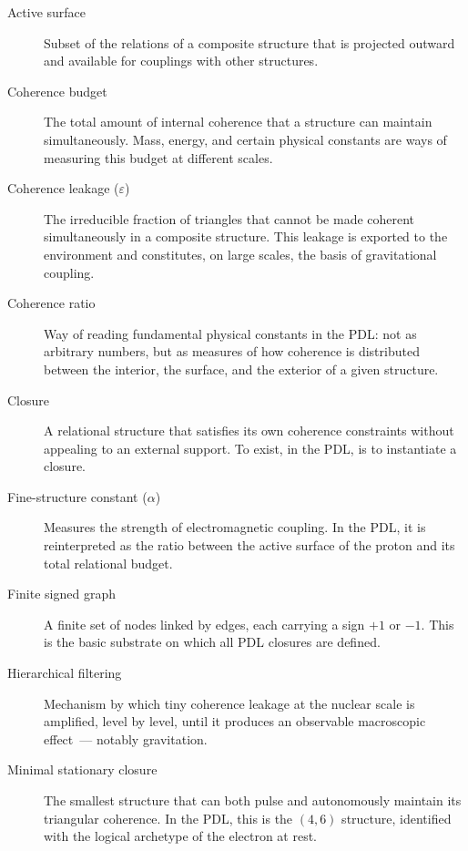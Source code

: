 \documentclass[12pt, a4paper, openright]{book}
\begin{document}
\begin{description}

\item[Active surface] Subset of the relations of a composite structure that is projected outward and available for couplings with other structures.

\item[Coherence budget] The total amount of internal coherence that a structure can maintain simultaneously. Mass, energy, and certain physical constants are ways of measuring this budget at different scales.

\item[Coherence leakage ($\varepsilon$)] The irreducible fraction of triangles that cannot be made coherent simultaneously in a composite structure. This leakage is exported to the environment and constitutes, on large scales, the basis of gravitational coupling.

\item[Coherence ratio] Way of reading fundamental physical constants in the PDL: not as arbitrary numbers, but as measures of how coherence is distributed between the interior, the surface, and the exterior of a given structure.

\item[Closure] A relational structure that satisfies its own coherence constraints without appealing to an external support. To exist, in the PDL, is to instantiate a closure.

\item[Fine-structure constant ($\alpha$)] Measures the strength of electromagnetic coupling. In the PDL, it is reinterpreted as the ratio between the active surface of the proton and its total relational budget.

\item[Finite signed graph] A finite set of nodes linked by edges, each carrying a sign $+1$ or $-1$. This is the basic substrate on which all PDL closures are defined.

\item[Hierarchical filtering] Mechanism by which tiny coherence leakage at the nuclear scale is amplified, level by level, until it produces an observable macroscopic effect~--- notably gravitation.

\item[Minimal stationary closure] The smallest structure that can both pulse and autonomously maintain its triangular coherence. In the PDL, this is the $(4,6)$ structure, identified with the logical archetype of the electron at rest.


\end{description}
\end{document}
